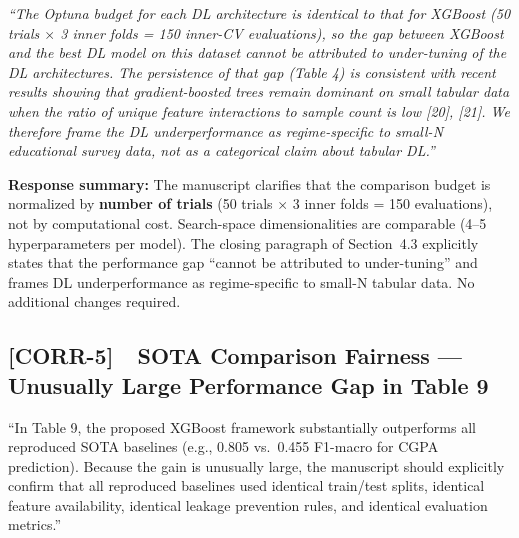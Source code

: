 \documentclass[11pt,a4paper]{article}
\newcommand{\cid}[1]{\textcolor{revred}{\textbf{[#1]}}}
\newcommand{\sectref}[1]{Section~#1}
\newcommand{\stress}[1]{\textbf{#1}}
\begin{document}
\begin{evidencebox}
\noindent \textit{``The Optuna budget for each DL architecture is identical to that for XGBoost (50 trials $\times$ 3 inner folds = 150 inner-CV evaluations), so the gap between XGBoost and the best DL model on this dataset cannot be attributed to under-tuning of the DL architectures. The persistence of that gap (Table 4) is consistent with recent results showing that gradient-boosted trees remain dominant on small tabular data when the ratio of unique feature interactions to sample count is low [20], [21]. We therefore frame the DL underperformance as regime-specific to small-N educational survey data, not as a categorical claim about tabular DL.''}
\end{evidencebox}

\begin{correctionbox}
\noindent \textbf{Response summary:} The manuscript  clarifies that the comparison budget is normalized by \stress{number of trials} (50 trials $\times$ 3 inner folds = 150 evaluations), not by computational cost. Search-space dimensionalities are comparable (4--5 hyperparameters per model). The closing paragraph of \sectref{4.3} explicitly states that the performance gap ``cannot be attributed to under-tuning'' and frames DL underperformance as regime-specific to small-N tabular data. No additional changes required.
\end{correctionbox}


\subsection*{\cid{CORR-5}~~SOTA Comparison Fairness — Unusually Large Performance Gap in Table 9}

\begin{reviewerquote}
``In Table 9, the proposed XGBoost framework substantially outperforms all reproduced SOTA baselines (e.g., 0.805 vs.\ 0.455 F1-macro for CGPA prediction). Because the gain is unusually large, the manuscript should explicitly confirm that all reproduced baselines used identical train/test splits, identical feature availability, identical leakage prevention rules, and identical evaluation metrics.''
\end{reviewerquote}
\end{document}
